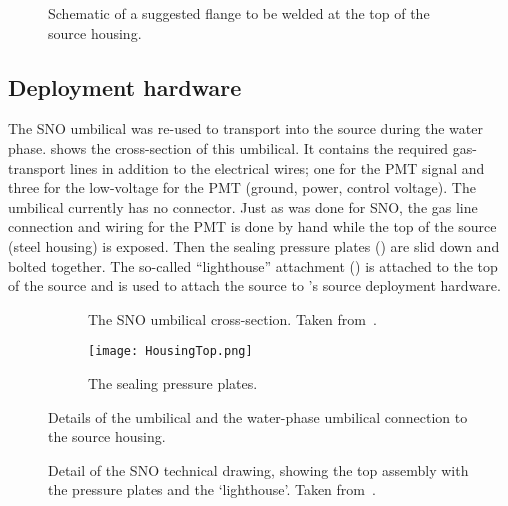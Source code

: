 \begin{figure}
\caption{\label{fig:flange} Schematic of a suggested flange to be welded at the top of the source housing. }
\end{figure}

\subsection{Deployment hardware}

The SNO \Li umbilical was re-used to transport \Li into the source during the {\snop} water phase.
 shows the cross-section of this umbilical. It contains the required gas-transport lines in addition to the electrical wires; one for the PMT signal and three for the low-voltage for the PMT (ground, power, control voltage). 
The umbilical currently has no connector. 
Just as was done for SNO, the gas line connection and wiring for the PMT is done by hand while the top of the source (steel housing) is exposed. 
Then the sealing pressure plates () are slid down and bolted together. 
The so-called ``lighthouse'' attachment () is attached to the top of the source and is used to attach the source to {\snop}'s source deployment hardware.

\begin{figure}
\begin{subfigure}[t]{.57\textwidth}
\caption{\label{fig:sno_umbilical} The SNO \Li umbilical cross-section. Taken from~\cite{Tagg:2001}.}
\end{subfigure}
\hfill
\begin{subfigure}[t]{.35\textwidth}
\texttt{[image: HousingTop.png]}
\caption{\label{fig:pressureplates} The sealing pressure plates.}
\end{subfigure}
\caption{Details of the umbilical and the water-phase umbilical connection to the source housing.}
\end{figure}

\begin{figure}
\caption{\label{fig:connection}Detail of the SNO \Li technical drawing, showing the top assembly with the pressure plates and the `lighthouse'. Taken from~\cite{Tagg:2001}.}
\end{figure}

